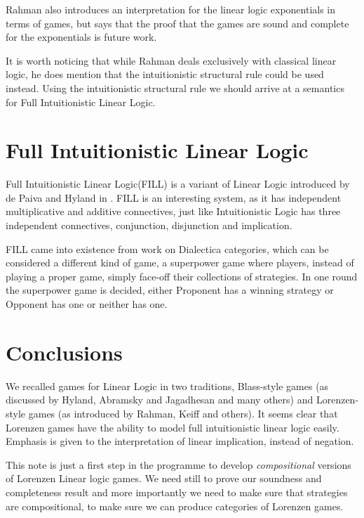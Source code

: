 \documentclass{article}
\begin{document}
 
 Rahman also introduces an interpretation for the linear logic exponentials  in terms of games, but says that the proof that the games are sound and complete for the exponentials is future work.
 
  It is worth noticing that while Rahman deals exclusively with classical linear logic, he does mention that the intuitionistic structural rule could be used instead. Using the intuitionistic structural rule we  should arrive at a semantics for 
 Full Intuitionistic Linear Logic.
 
 \section*{Full Intuitionistic Linear Logic}
Full Intuitionistic Linear Logic(FILL) is a variant of Linear Logic introduced by de Paiva and Hyland in \cite{hyland-depaiva93}. FILL is an interesting system, as it has independent multiplicative and additive connectives, just like Intuitionistic Logic has three independent connectives, conjunction, disjunction and implication.  

FILL came into existence from work on Dialectica categories, which can be considered a different kind of game, a superpower game where players, instead of playing a proper game, simply face-off their collections of strategies. In one round the superpower game is decided, either Proponent has a winning strategy or   Opponent has one or neither has one.


 \section*{Conclusions}
 We recalled games for Linear Logic in two traditions, Blass-style games (as discussed by  Hyland, Abramsky and Jagadhesan and many others) and Lorenzen-style games (as introduced by Rahman, Keiff and others). It seems clear that Lorenzen games have the ability to model full intuitionistic linear logic easily. Emphasis is given to the interpretation of linear implication, instead of negation. 
 
 This note is just a first step in the programme to develop {\em compositional} versions of Lorenzen Linear logic games. We need still to prove our soundness and completeness result and more importantly we need to make sure that strategies are compositional, to make sure we can produce categories of Lorenzen games.
\end{document}
